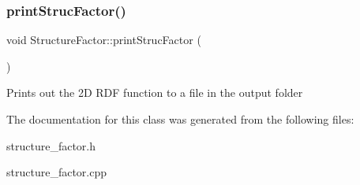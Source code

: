 \subsubsection{\texorpdfstring{print\+Struc\+Factor()}{printStrucFactor()}}
{\footnotesize\ttfamily void Structure\+Factor\+::print\+Struc\+Factor (\begin{DoxyParamCaption}{ }\end{DoxyParamCaption})}

Prints out the 2D R\+DF function to a file in the output folder 

The documentation for this class was generated from the following files\+:\begin{DoxyCompactItemize}
\item 
structure\+\_\+factor.\+h\item 
structure\+\_\+factor.\+cpp\end{DoxyCompactItemize}
